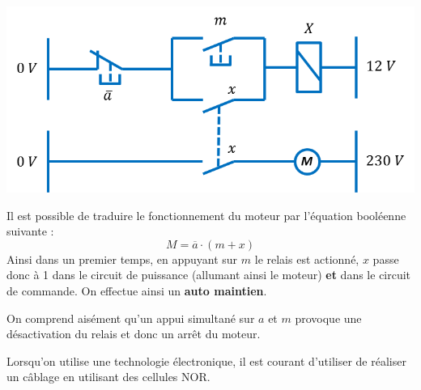 \documentclass[10pt,fleqn]{article} %
\begin{document}
 
\begin{minipage}[c]{.5\linewidth}
\begin{center}
\includegraphics[width=\textwidth]{images/mem_eff}
\end{center}
\end{minipage} \hfill
\begin{minipage}[c]{.47\linewidth}
Il est possible de traduire le fonctionnement du moteur par l'équation booléenne suivante : 
$$
M = \overline{a} \cdot \left(m +  x \right)
$$
Ainsi dans un premier temps, en appuyant sur $m$ le relais est actionné, $x$ passe donc à 1 dans le circuit de puissance (allumant ainsi le moteur) \textbf{et} dans le circuit de commande. On effectue ainsi un \textbf{auto maintien}. 

On comprend aisément qu'un appui simultané sur $a$ et $m$ provoque une désactivation du relais et donc un arrêt du moteur. 
\end{minipage}

 Lorsqu'on utilise une technologie électronique, il est courant d'utiliser de réaliser un câblage en utilisant des cellules NOR. 

\vspace{.2cm}
\end{document}
